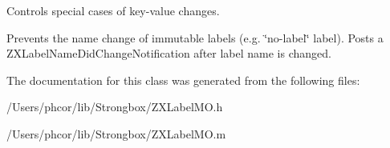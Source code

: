 Controls special cases of key-value changes. 

Prevents the name change of immutable labels (e.g. \char`\"{}no-label\char`\"{} label). Posts a ZXLabelNameDidChangeNotification after label name is changed. 

The documentation for this class was generated from the following files:\begin{CompactItemize}
\item 
/Users/phcor/lib/Strongbox/ZXLabelMO.h\item 
/Users/phcor/lib/Strongbox/ZXLabelMO.m\end{CompactItemize}
